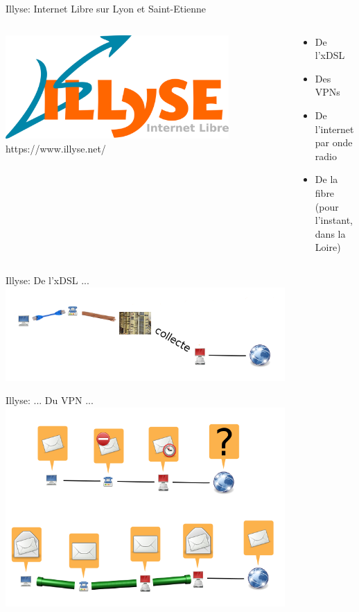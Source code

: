 \begin{frame}{Illyse: Internet Libre sur Lyon et Saint-Etienne}
  \begin{columns}
    \begin{column}{0.5\textwidth}
      \centering
      \includegraphics[width=0.8\textwidth]{un_autre_internet/illyse.png}\\
      https://www.illyse.net/
    \end{column}
    \begin{column}{0.5\textwidth}
      \begin{itemize}
        \item De l'xDSL
        \item Des VPNs
        \item De l'internet par onde radio
        \item De la fibre \\{\tiny(pour l'instant, dans la Loire)}
      \end{itemize}
    \end{column}
  \end{columns}
\end{frame}

\begin{frame}{Illyse: De l'xDSL ...}
  \centering
  \includegraphics[width=0.8\textwidth]{un_autre_internet/adsl.png}
\end{frame}

\begin{frame}{Illyse: \hfill ... Du VPN ...\hfill}
  \centering
  \includegraphics[width=0.8\textwidth]{un_autre_internet/vpn.png}
\end{frame}

